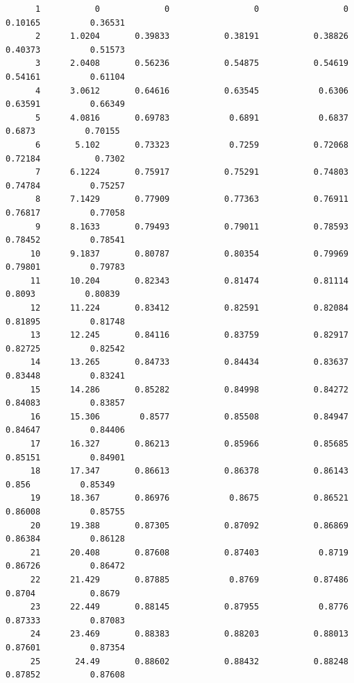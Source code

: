 \documentclass[
]{book}
\begin{document}
\begin{verbatim}
      1           0             0                 0                 0           0.10165          0.36531   
      2      1.0204       0.39833           0.38191           0.38826           0.40373          0.51573   
      3      2.0408       0.56236           0.54875           0.54619           0.54161          0.61104   
      4      3.0612       0.64616           0.63545            0.6306           0.63591          0.66349   
      5      4.0816       0.69783            0.6891            0.6837            0.6873          0.70155   
      6       5.102       0.73323            0.7259           0.72068           0.72184           0.7302   
      7      6.1224       0.75917           0.75291           0.74803           0.74784          0.75257   
      8      7.1429       0.77909           0.77363           0.76911           0.76817          0.77058   
      9      8.1633       0.79493           0.79011           0.78593           0.78452          0.78541   
     10      9.1837       0.80787           0.80354           0.79969           0.79801          0.79783   
     11      10.204       0.82343           0.81474           0.81114            0.8093          0.80839   
     12      11.224       0.83412           0.82591           0.82084           0.81895          0.81748   
     13      12.245       0.84116           0.83759           0.82917           0.82725          0.82542   
     14      13.265       0.84733           0.84434           0.83637           0.83448          0.83241   
     15      14.286       0.85282           0.84998           0.84272           0.84083          0.83857   
     16      15.306        0.8577           0.85508           0.84947           0.84647          0.84406   
     17      16.327       0.86213           0.85966           0.85685           0.85151          0.84901   
     18      17.347       0.86613           0.86378           0.86143             0.856          0.85349   
     19      18.367       0.86976            0.8675           0.86521           0.86008          0.85755   
     20      19.388       0.87305           0.87092           0.86869           0.86384          0.86128   
     21      20.408       0.87608           0.87403            0.8719           0.86726          0.86472   
     22      21.429       0.87885            0.8769           0.87486            0.8704           0.8679   
     23      22.449       0.88145           0.87955            0.8776           0.87333          0.87083   
     24      23.469       0.88383           0.88203           0.88013           0.87601          0.87354   
     25       24.49       0.88602           0.88432           0.88248           0.87852          0.87608   

\end{verbatim}
\end{document}

